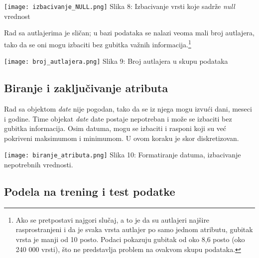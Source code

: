 \documentclass[a4paper]{article}
\begin{document}
{\noindent\begin{minipage}{1.0\textwidth}
\texttt{[image: izbacivanje\_NULL.png]}
\hphantom{aaaaaaaaaaaaaaaa}Slika 8: Izbacivanje vrsti koje sadrže {\em null} vrednost\\
\end{minipage}

Rad sa autlajerima je sličan; u bazi podataka se nalazi veoma mali broj autlajera, tako da se oni mogu izbaciti bez gubitka važnih informacija.\footnote[2]{Ako se pretpostavi najgori slučaj, a to je da su autlajeri najšire rasprostranjeni i da je svaka vrsta autlajer po samo jednom atributu, gubitak vrsta je manji od 10 posto. Podaci pokazuju gubitak od oko 8,6 posto (oko 240 000 vrsti), što ne predstavlja problem na ovakvom skupu podataka.}\\

\noindent\begin{minipage}{1.0\textwidth}
\texttt{[image: broj\_autlajera.png]}
\hphantom{aaaaaaaaaaaaaaaaaaaa}Slika 9: Broj autlajera u skupu podataka\\
\end{minipage}

\subsection{Biranje i zaključivanje atributa}
\label{biranje}

\noindent\begin{minipage}{0.4\textwidth}
Rad sa objektom {\em date} nije pogodan, tako da se iz njega mogu izvući dani, meseci i godine. Time objekat {\em date} date postaje nepotreban i može se izbaciti bez gubitka informacija. Osim datuma, mogu se izbaciti i rasponi koji su već pokriveni maksimumom i minimumom. U ovom koraku je skor diskretizovan.
\end{minipage}
\begin{minipage}{0.1\textwidth}
\hphantom{a}
\end{minipage}
\begin{minipage}{0.6\textwidth}
\texttt{[image: biranje\_atributa.png]}
Slika 10: Formatiranje datuma, izbacivanje nepotrebnih vrednosti.\\
\end{minipage}

\subsection{Podela na trening i test podatke}
\label{podela}

}
\end{document}
